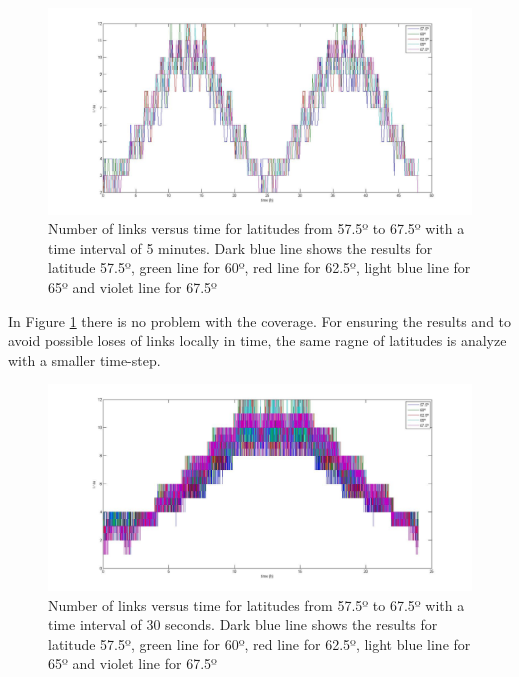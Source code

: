 \begin{figure}[H]
\begin{center}
\includegraphics[scale=0.30]{575_25_675_lat.jpg}
\caption[Links vs time for latitudes from 57.5º to 67.5º]{Number of links versus time for latitudes from 57.5º to 67.5º with a time interval of 5 minutes. Dark blue line shows the results for latitude 57.5º, green line for 60º, red line for 62.5º, light blue line for 65º and violet line for 67.5º}
\label{fig:lat6}
\end{center}
\end{figure}
In Figure \ref{fig:lat6} there is no problem with the coverage. For ensuring the results and to avoid possible loses of links locally in time, the same ragne of latitudes is analyze with a smaller time-step.
\begin{figure}[H]
\begin{center}
\includegraphics[scale=0.30]{575_25_675_(30s)_lat.jpg}
\caption[Links vs time for latitudes from 57.5º to 67.5º reduced timestep]{Number of links versus time for latitudes from 57.5º to 67.5º with a time interval of 30 seconds. Dark blue line shows the results for latitude 57.5º, green line for 60º, red line for 62.5º, light blue line for 65º and violet line for 67.5º}
\label{fig:lat7}
\end{center}
\end{figure}
